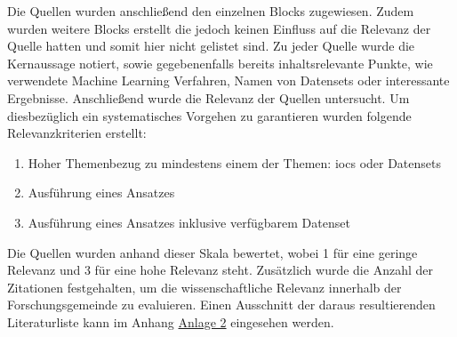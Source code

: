 \documentclass[
    12pt, %
    DIV10,
    ngerman, %
    a4paper, %
    oneside, %
    titlepage, %
    parskip=half, %
    headings=normal, %
    listof=totoc, %
    bibliography=totoc, %
    index=totoc, %
    captions=tableheading, %
    final %
]{scrreprt}
\begin{document}
Die Quellen wurden anschließend den einzelnen Blocks zugewiesen. Zudem wurden weitere Blocks erstellt die jedoch keinen Einfluss auf die Relevanz der Quelle hatten und somit hier nicht gelistet sind. Zu jeder Quelle wurde die Kernaussage notiert, sowie gegebenenfalls bereits inhaltsrelevante Punkte, wie verwendete Machine Learning Verfahren, Namen von Datensets oder interessante Ergebnisse. Anschließend wurde die Relevanz der Quellen untersucht. 
Um diesbezüglich ein systematisches Vorgehen zu garantieren wurden folgende Relevanzkriterien erstellt:
\begin{enumerate}
\item Hoher Themenbezug zu mindestens einem der Themen: \ac{iocs} oder Datensets
\item Ausführung eines Ansatzes
\item Ausführung eines Ansatzes inklusive verfügbarem Datenset
\end{enumerate}
Die Quellen wurden anhand dieser Skala bewertet, wobei 1 für eine geringe Relevanz und 3 für eine hohe Relevanz steht.
Zusätzlich wurde die Anzahl der Zitationen festgehalten, um die wissenschaftliche Relevanz innerhalb der Forschungsgemeinde zu evaluieren. Einen Ausschnitt der daraus resultierenden Literaturliste kann im Anhang \hyperref[literaturr]{Anlage 2} eingesehen werden.
\end{document}
